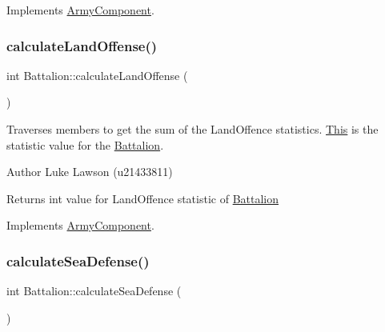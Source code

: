 Implements \mbox{\hyperlink{class_army_component_a88558b28106a5d461fcc9ca2eb8e7a40}{Army\+Component}}.

\mbox{\label{class_battalion_a4b7a80080e4333259679e8b2cb522ae9}} 
\subsubsection{\texorpdfstring{calculateLandOffense()}{calculateLandOffense()}}
{\footnotesize\ttfamily int Battalion\+::calculate\+Land\+Offense (\begin{DoxyParamCaption}{ }\end{DoxyParamCaption})\hspace{0.3cm}{\ttfamily [virtual]}}



Traverses members to get the sum of the Land\+Offence statistics. \mbox{\hyperlink{class_this}{This}} is the statistic value for the \mbox{\hyperlink{class_battalion}{Battalion}}. 

\begin{DoxyAuthor}{Author}
Luke Lawson (u21433811) 
\end{DoxyAuthor}
\begin{DoxyReturn}{Returns}
int value for Land\+Offence statistic of \mbox{\hyperlink{class_battalion}{Battalion}} 
\end{DoxyReturn}


Implements \mbox{\hyperlink{class_army_component_a0556ff6dbfa956f9ab52aadaa6a331e1}{Army\+Component}}.

\mbox{\label{class_battalion_a85b6a7096cce8ade372f1320bdc5949a}} 
\subsubsection{\texorpdfstring{calculateSeaDefense()}{calculateSeaDefense()}}
{\footnotesize\ttfamily int Battalion\+::calculate\+Sea\+Defense (\begin{DoxyParamCaption}{ }\end{DoxyParamCaption})\hspace{0.3cm}{\ttfamily [virtual]}}



